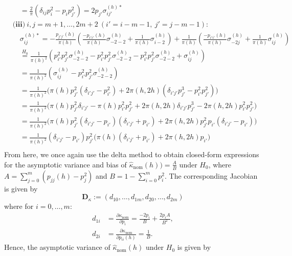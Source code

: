 ﻿\documentclass[12pt,a4paper]{scrreprt}
\theoremstyle{definition}
\begin{document}
\begin{appendices}
\begin{align*}
    &\quad =\frac{2}{\pi}(\delta_{ij}p_i^2-p_i p_{j'}^2) = 2 p_{j'} \sigma^{(h)*}_{ij'} \\
    &\textbf{(iii)}\ i,j = m+1, \ldots, 2m+2 
    \ (i' = i-m-1,\ j' = j-m-1): \\
    &\quad \sigma^{(h)*}_{ij}
    = -\frac{p_{j'j'}(h)}{\pi(h)}\left(\frac{-p_{i'i'}(h)}{\pi(h)}\sigma_{-2-2}^{(h)}+ \frac{1}{\pi(h)}\sigma_{i-2}^{(h)}\right) + \frac{1}{\pi(h)}\left(\frac{-p_{i'i'}(h)}{\pi(h)}\sigma_{-2j}^{(h)}+ \frac{1}{\pi(h)}\sigma_{ij}^{(h)}\right)\\
    &\quad \overset{H_0}{=} \frac{1}{\pi(h)^2} \left( p_{i'}^2 p_{j'}^2 \sigma_{-2 -2}^{(h)} - p_{i'}^2 p_{j'}^2 \sigma_{-2 -2}^{(h)} - p_{i'}^2 p_{j'}^2 \sigma_{-2 -2}^{(h)}  + \sigma^{(h)}_{ij} \right) \\
    &\quad = \frac{1}{\pi(h)^2}  \left(\sigma_{ij}^{(h)} -p_{i'}^2 p_{j'}^2 \sigma_{-2-2}^{(h)}\right) \\
    &\quad = \frac{1}{\pi(h)^2}\bigl(\pi(h)p_{j'}^2(\delta_{i'j'} - p_{i'}^2) + 2\pi(h, 2h) (\delta_{i'j'} p_{j'}^3- p_{i'}^2p_{j'}^2)\bigr) \\
    &\quad = \frac{1}{\pi(h)^2}\bigl(\pi(h)p_{j'}^2\delta_{i'j'} - \pi(h)p_{i'}^2 p_{j'}^2 + 2\pi(h, 2h)\delta_{i'j'} p_{j'}^3 - 2\pi(h, 2h) p_{i'}^2 p_{j'}^2\bigr) \\
    &\quad = \frac{1}{\pi(h)^2}\bigl(\pi(h)p_{j'}^2(\delta_{i'j'} - p_{i'})(\delta_{i'j'} + p_{i'}) + 2\pi(h, 2h) p_{j'}^2p_{i'}(\delta_{i'j'}  - p_{i'})\bigr)\\
    &\quad = \frac{1}{\pi(h)^2}(\delta_{i'j'} - p_{i'})p_{j'}^2\bigl(\pi(h)(\delta_{i'j'} + p_{i'}) + 2\pi(h, 2h) p_{i'}\bigr) \\
\end{align*}
From here, we once again use the delta method to obtain closed-form expressions for the asymptotic variance and bias of $\hat{\kappa}_{\mathrm{nom}}(h) )= \frac{A}{B}$ under $H_0$,
where $A = \sum_{j = 0}^{m}(p_{jj}(h)-p_j^2)$ and $B= 1- \sum_{i = 0}^{m} p_i^2$. The corresponding 
Jacobian is given by
\[\boldsymbol{D}_\kappa:= (d_{10},\ldots, d_{1m}, d_{20},\ldots, d_{2m})\]
where for $i = 0, \ldots, m$:
\begin{align*}
    d_{1i} &= \frac{\partial \kappa_{\mathrm{nom}}}{\partial p_i} = \frac{-2p_i}{B} + \frac{2p_i A}{B^2},\\
    d_{2i} &= \frac{\partial \kappa_{\mathrm{nom}}}{\partial p_{ii}(h)} = \frac{1}{B}.
\end{align*}
Hence, the asymptotic variance of $\hat{\kappa}_{\mathrm{nom}}(h)$ under $H_0$ is given by



\end{appendices}
\end{document}
